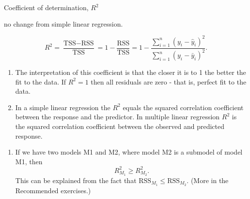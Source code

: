\documentclass[10pt,ignorenonframetext,]{beamer}
\providecommand{\tightlist}{%
  \setlength{\itemsep}{0pt}\setlength{\parskip}{0pt}}
\begin{document}
\begin{frame}

\begin{block}{Coefficient of determination, \(R^2\)}

no change from simple linear regression.

\[R^2 = \frac{\text{TSS}-\text{RSS}}{\text{TSS}}= 1-\frac{\text{RSS}}{\text{TSS}}=1-\frac{\sum_{i=1}^n(y_i-\hat{y}_i)^2}{\sum_{i=1}^n(y_i-\bar{y}_i)^2}.\]

\begin{enumerate}
\def\labelenumi{\arabic{enumi}.}
\item
  The interpretation of this coefficient is that the closer it is to 1
  the better the fit to the data. If \(R^2=1\) then all residuals are
  zero - that is, perfect fit to the data.
\item
  In a simple linear regression the \(R^2\) equals the squared
  correlation coefficient between the response and the predictor. In
  multiple linear regression \(R^2\) is the squared correlation
  coefficient between the observed and predicted response.
\end{enumerate}

\end{block}

\end{frame}

\begin{frame}

\begin{enumerate}
\def\labelenumi{\arabic{enumi}.}
\setcounter{enumi}{2}
\tightlist
\item
  If we have two models M1 and M2, where model M2 is a submodel of model
  M1, then \[ R^2_{M_1}\ge R^2_{M_2}.\] This can be explained from the
  fact that \(\text{RSS}_{M_1}\le \text{RSS}_{M_2}\). (More in the
  Recommended exercises.)
\end{enumerate}

\end{frame}
\end{document}
